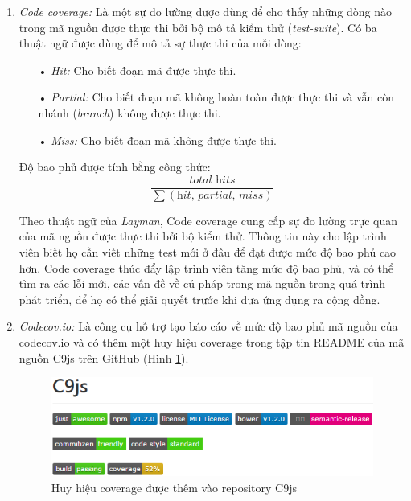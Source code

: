 \documentclass[12pt,a4paper,twoside]{article}
\begin{document}
\begin{enumerate}
\item \emph{Code coverage:}
Là một sự đo lường được dùng để cho thấy những dòng nào trong mã nguồn được thực thi bởi bộ mô tả kiểm thử (\textit{test-suite}). Có ba thuật ngữ được dùng để mô tả sự thực thi của mỗi dòng:

\begin{itemize}
\item[•] \emph{Hit:} Cho biết đoạn mã được thực thi.
\item[•] \emph{Partial:} Cho biết đoạn mã không hoàn toàn được thực thi và vẫn còn nhánh (\textit{branch}) không được thực thi.
\item[•] \emph{Miss:} Cho biết đoạn mã không được thực thi.
\end{itemize}

Độ bao phủ được tính bằng công thức:
\[
    \frac{\textit{total hits}}{\sum{(\textit{hit, partial, miss})}}
\]

Theo thuật ngữ của \textit{Layman}\citep{codecov_wiki}, Code coverage cung cấp sự đo lường trực quan của mã nguồn được thực thi bởi bộ kiểm thử. Thông tin này cho lập trình viên biết họ cần viết những test mới ở đâu để đạt được mức độ bao phủ cao hơn. Code coverage thúc đẩy lập trình viên tăng mức độ bao phủ, và có thể tìm ra các lỗi mới, các vấn đề về cú pháp trong mã nguồn trong quá trình phát triển, để họ có thể giải quyết trước khi đưa ứng dụng ra cộng đồng. \\

\item \emph{Codecov.io:}
Là công cụ hỗ trợ tạo báo cáo về mức độ bao phủ mã nguồn của codecov.io và có thêm một huy hiệu coverage trong tập tin \textsf{README} của mã nguồn C9js trên GitHub (Hình \ref{fig:codecovio}). 

\begin{figure}[!h]
	\begin{center}
    \includegraphics[scale=1]{image/codecovio}
    \caption{Huy hiệu coverage được thêm vào repository C9js}
    \label{fig:codecovio}
	\end{center}
\end{figure}


\end{enumerate}
\end{document}

